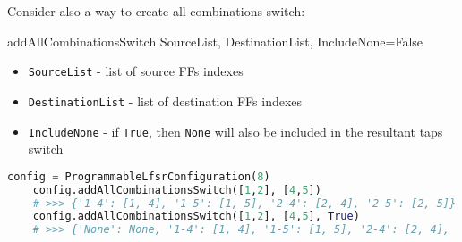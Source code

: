 Consider also a way to create all-combinations switch:

 {addAllCombinationsSwitch} {SourceList, DestinationList, IncludeNone=False} {
	\begin{itemize}
		\item \texttt{SourceList} - list of source FFs indexes
		\item \texttt{DestinationList} - list of destination FFs indexes
		\item \texttt{IncludeNone} - if \texttt{True}, then \texttt{None} will also be included in the resultant taps switch
	\end{itemize}
}
\begin{lstlisting}[language=Python]
	config = ProgrammableLfsrConfiguration(8)
	config.addAllCombinationsSwitch([1,2], [4,5])
	# >>> {'1-4': [1, 4], '1-5': [1, 5], '2-4': [2, 4], '2-5': [2, 5]}
	config.addAllCombinationsSwitch([1,2], [4,5], True)
	# >>> {'None': None, '1-4': [1, 4], '1-5': [1, 5], '2-4': [2, 4], '2-5': [2, 5]}
\end{lstlisting}
